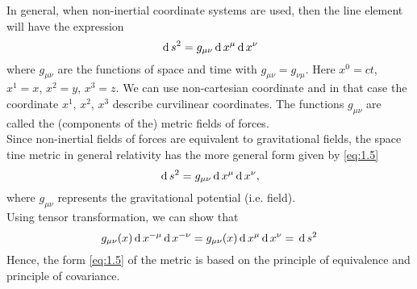 \documentclass[../main-sheet.tex]{subfiles}
\begin{document}
\begin{soln}
In general, when non-inertial coordinate systems are used, then the line element will have the expression
\begin{equation}
    \,\mathrm{d}\, s^2=g_{\mu\nu}\,\mathrm{d}\, x^\mu\,\mathrm{d}\, x^\nu\label{eq:1.5}
\end{equation}
where \(g_{\mu\nu}\) are the functions of space and time with \(g_{\mu\nu}=g_{\nu\mu}\). Here \(x^0 = ct\), \(x^1 = x\), \(x^2 = y\), \(x^3 = z\).
We can use non-cartesian coordinate and in that case the coordinate \(x^1\), \(x^2\), \(x^3\) describe curvilinear coordinates.
The functions \(g_{\mu\nu}\) are called the (components of the) metric fields of forces.\\
Since non-inertial fields of forces are equivalent to gravitational fields, the space tine  metric  in  general  relativity  has  the	more general form given by \eqref{eq:1.5}
\[\,\mathrm{d}\, s^2=g_{\mu\nu}\,\mathrm{d}\, x^\mu\,\mathrm{d}\, x^\nu,\]
where \(g_{\mu\nu}\) represents the gravitational potential (i.e. field).\\
Using tensor transformation, we can show that
\[g_{\mu\nu}(x)\,\mathrm{d}\, x^{-\mu}\,\mathrm{d}\, x^{-\nu}=g_{\mu\nu}(x)\,\mathrm{d}\, x^{\mu}\,\mathrm{d}\, x^\nu=\,\mathrm{d}\, s^2\]
Hence, the form \eqref{eq:1.5} of the metric is based on the principle of equivalence and principle of covariance.
\end{soln}
\end{document}
